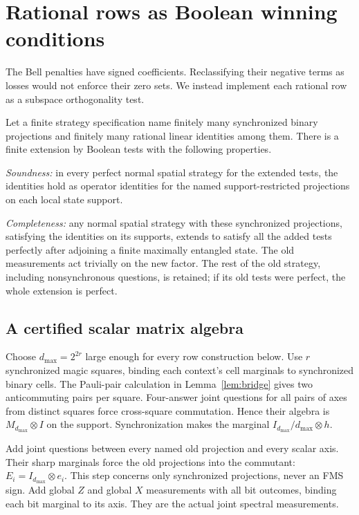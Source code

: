 \section{Rational rows as Boolean winning conditions}\label{sec:compiler}
The Bell penalties have signed coefficients. Reclassifying their negative terms as losses would not enforce their zero sets. We instead implement each rational row as a subspace orthogonality test.

\begin{theoremB}\label{thm:B}
Let a finite strategy specification name finitely many synchronized binary projections and finitely many rational linear identities among them. There is a finite extension by Boolean tests with the following properties.

\emph{Soundness:} in every perfect normal spatial strategy for the extended tests, the identities hold as operator identities for the named support-restricted projections on each local state support.

\emph{Completeness:} any normal spatial strategy with these synchronized projections, satisfying the identities on its supports, extends to satisfy all the added tests perfectly after adjoining a finite maximally entangled state. The old measurements act trivially on the new factor. The rest of the old strategy, including nonsynchronous questions, is retained; if its old tests were perfect, the whole extension is perfect.
\end{theoremB}

\subsection{A certified scalar matrix algebra}
Choose $d_{\max}=2^{2r}$ large enough for every row construction below. Use $r$ synchronized magic squares, binding each context's cell marginals to synchronized binary cells. The Pauli-pair calculation in Lemma~\ref{lem:bridge} gives two anticommuting pairs per square. Four-answer joint questions for all pairs of axes from distinct squares force cross-square commutation. Hence their algebra is $M_{d_{\max}}\otimes I$ on the support. Synchronization makes the marginal $I_{d_{\max}}/d_{\max}\otimes h$.

Add joint questions between every named old projection and every scalar axis. Their sharp marginals force the old projections into the commutant: $E_i=I_{d_{\max}}\otimes e_i$. This step concerns only synchronized projections, never an FMS sign. Add global $Z$ and global $X$ measurements with all bit outcomes, binding each bit marginal to its axis. They are the actual joint spectral measurements.


